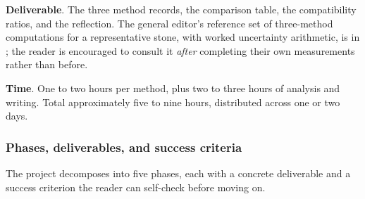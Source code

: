 \begin{project}
\textbf{Deliverable}. The three method records, the comparison
table, the compatibility ratios, and the reflection. The general
editor's reference set of three-method computations for a
representative stone, with worked uncertainty arithmetic, is in
;
the reader is encouraged to consult it \emph{after} completing their
own measurements rather than before.

\textbf{Time}. One to two hours per method, plus two to three hours
of analysis and writing. Total approximately five to nine hours,
distributed across one or two days.

\subsubsection*{Phases, deliverables, and success criteria}

The project decomposes into five phases, each with a concrete
deliverable and a success criterion the reader can self-check
before moving on.


\end{project}
